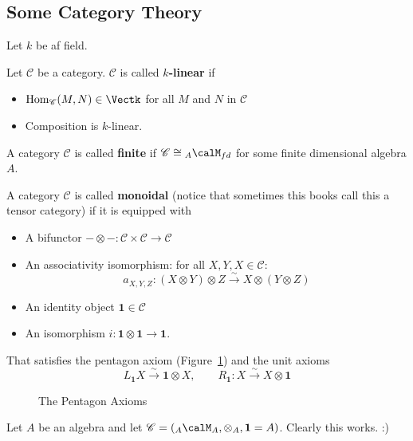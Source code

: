 \documentclass[12pt]{article}
\theoremstyle{break}
\theoremstyle{nonumberbreak}
\theoremstyle{changebreak}
\theoremstyle{break}
\theoremstyle{nonumberbreak}
\theoremstyle{nonumberplain}
\theoremstyle{change}
\DeclareMathOperator{\id}{id}
\newcommand*{\Hom}{\ensuremath\text{Hom}}
\begin{document}
\subsection{Some Category Theory}
Let $k$ be af field.
\begin{defn}
	Let $\mathscr C$ be a category. $\mathscr C$ is called \textbf{$k$-linear} if
	\begin{itemize}
		\item $\Hom_{\mathscr C}(M,N)\in\Vectk$ for all $M$ and $N$ in $\mathscr C$
		\item Composition is $k$-linear.
	\end{itemize}
\end{defn}
\begin{defn}
	A category $\mathscr C$ is called \textbf{finite} if $\mathscr C\cong {_A\calM_{fd}}$ 
	for some finite dimensional algebra $A$.
\end{defn}
\begin{defn}
	A category $\mathscr C$ is called \textbf{monoidal} (notice that sometimes this books 
	call this a tensor category) if it is equipped with
	\begin{itemize}
		\item A bifunctor $-\otimes -:\mathscr C\times\mathscr C\to \mathscr C$
		\item An associativity isomorphism: for all $X,Y,X\in\mathscr C$:
		\[a_{X,Y,Z}:(X\otimes Y)\otimes Z\xrightarrow{\sim} X\otimes(Y\otimes Z)\]
		\item An identity object $\mathbf{1}\in\mathscr{C}$
		\item An isomorphism $i:\mathbf{1}\otimes\mathbf{1}\to \mathbf{1}.$
	\end{itemize}
	That satisfies the pentagon axiom (Figure~\ref{fig:pentagon}) and the unit axioms
	\[L_\mathbf{1}X\xrightarrow{\sim} \mathbf{1}\otimes X,\qquad R_\mathbf{1}:X\xrightarrow{\sim}X\otimes \mathbf{1}\]
\end{defn}
\begin{figure}\label{fig:pentagon}
	\centering
	\caption{The Pentagon Axioms}
\end{figure}
\begin{ex}
	Let $A$ be an algebra and let $\mathscr C= ({_A\calM_A},\otimes_A,\mathbf{1}=A)$.
	Clearly this works. :)
\end{ex}
\end{document}
